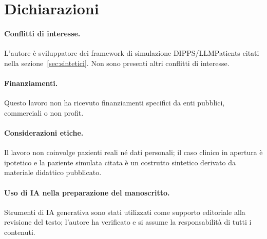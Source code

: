 \documentclass[11pt,a4paper]{article}
\begin{document}
\section*{Dichiarazioni}

\paragraph{Conflitti di interesse.} L'autore è sviluppatore dei framework di simulazione DIPPS/LLMPatients citati nella sezione~\ref{sec:sintetici}. Non sono presenti altri conflitti di interesse.

\paragraph{Finanziamenti.} Questo lavoro non ha ricevuto finanziamenti specifici da enti pubblici, commerciali o non profit.

\paragraph{Considerazioni etiche.} Il lavoro non coinvolge pazienti reali né dati personali; il caso clinico in apertura è ipotetico e la paziente simulata citata è un costrutto sintetico derivato da materiale didattico pubblicato.

\paragraph{Uso di IA nella preparazione del manoscritto.} Strumenti di IA generativa sono stati utilizzati come supporto editoriale alla revisione del testo; l'autore ha verificato e si assume la responsabilità di tutti i contenuti.

{\small


}
\end{document}
